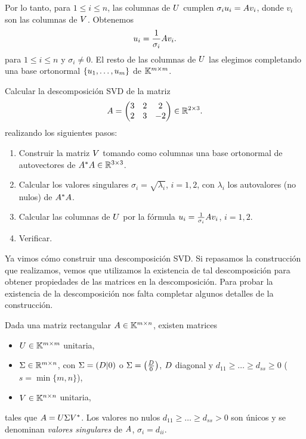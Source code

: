 Por lo tanto, para $1 \le i \le n$, las columnas de $\Ub$ cumplen $\sigma_i \ub_i = \Ab \vb_i$, donde
$v_i$ son las columnas de $\Vb$. Obtenemos
$$
\ub_i = \frac{1}{\sigma_i} \Ab \vb_i.
$$
para $1 \le i \le n$ y $\sigma_i \neq 0$.
El resto de las columnas de $\Ub$ las elegimos completando una base ortonormal $\{\ub_1, \dots, \ub_m\}$ de $\mathbb K^{m \times m}$.

\begin{ejercicio}
Calcular la descomposición SVD de la matriz
$$
\Ab = \begin{pmatrix}
3 & 2 & 2 \\
2 & 3 & -2 \\
\end{pmatrix} \in \R^{2 \times 3}.
$$
realizando los siguientes pasos:
\begin{enumerate}
\item Construir la matriz $\Vb$ tomando como columnas una base ortonormal de autovectores de $\Ab^* \Ab \in \R^{3 \times 3}$.
\item Calcular los valores singulares $\sigma_i = \sqrt{\lambda_i}$, $i = 1,2$, con $\lambda_i$ los autovalores (no nulos) de $\Ab^* \Ab$.
\item Calcular las columnas de $\Ub$ por la fórmula $\ub_i = \frac{1}{\sigma_i} \Ab \vb_i$, $i = 1,2$.
\item Verificar.
\end{enumerate}
\end{ejercicio}

Ya vimos cómo construir una descomposición SVD. Si repasamos la construcción que realizamos, vemos que utilizamos la existencia de tal descomposición para obtener propiedades de las matrices en la descomposición. Para probar la existencia de la descomposición nos falta completar algunos detalles de la construcción.

\begin{teo}
Dada una matriz rectangular $\Ab \in \K^{m \times n}$, existen matrices
\begin{itemize}
\item $\Ub \in \K^{m \times m}$ unitaria,
\item $\Sigmab \in \R^{m \times n}$, con $\Sigmab = (\Db | 0)$ o $\Sigmab = \left(\frac{\Db}{0}\right)$, $\Db$ diagonal y $d_{11} \ge \dots \ge d_{ss} \ge 0$ ($s = \min\{m,n\}$),
\item $\Vb \in \K^{n \times n}$ unitaria,
\end{itemize}
tales que $\Ab = \Ub \Sigmab \Vb^*$.
Los valores no nulos $d_{11} \ge \dots \ge d_{ss} > 0$ son \'unicos y se denominan \emph{valores singulares} de $\Ab$, $\sigma_i = d_{ii}$.
\end{teo}

